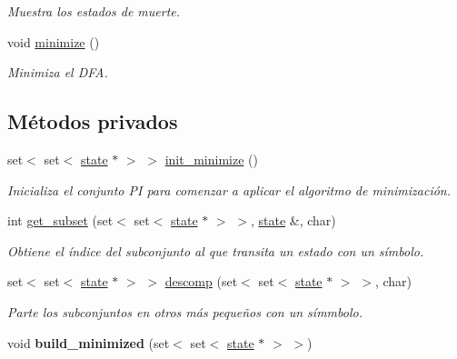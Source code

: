 \begin{DoxyCompactItemize}
\begin{DoxyCompactList}\small\item\em Muestra los estados de muerte. \end{DoxyCompactList}\item 
void \hyperlink{classdfa_a26fb1639aa9a6a5d9d8a079fd1989d0e}{minimize} ()
\begin{DoxyCompactList}\small\item\em Minimiza el D\+F\+A. \end{DoxyCompactList}\end{DoxyCompactItemize}
\subsection*{Métodos privados}
\begin{DoxyCompactItemize}
\item 
set$<$ set$<$ \hyperlink{classstate}{state} $\ast$ $>$ $>$ \hyperlink{classdfa_a23c531657e7259ffffd6a3fcf4b02691}{init\+\_\+minimize} ()
\begin{DoxyCompactList}\small\item\em Inicializa el conjunto P\+I para comenzar a aplicar el algoritmo de minimización. \end{DoxyCompactList}\item 
int \hyperlink{classdfa_af77ee3f7303bf187565a3740f8653797}{get\+\_\+subset} (set$<$ set$<$ \hyperlink{classstate}{state} $\ast$ $>$ $>$, \hyperlink{classstate}{state} \&, char)
\begin{DoxyCompactList}\small\item\em Obtiene el índice del subconjunto al que transita un estado con un símbolo. \end{DoxyCompactList}\item 
set$<$ set$<$ \hyperlink{classstate}{state} $\ast$ $>$ $>$ \hyperlink{classdfa_ab903e23857c42839f688e93c2d1cfc94}{descomp} (set$<$ set$<$ \hyperlink{classstate}{state} $\ast$ $>$ $>$, char)
\begin{DoxyCompactList}\small\item\em Parte los subconjuntos en otros más pequeños con un símmbolo. \end{DoxyCompactList}\item 
\hypertarget{classdfa_abcb8030d15366bc21c1a27432c05bab5}{}void {\bfseries build\+\_\+minimized} (set$<$ set$<$ \hyperlink{classstate}{state} $\ast$ $>$ $>$)\label{classdfa_abcb8030d15366bc21c1a27432c05bab5}


\end{DoxyCompactItemize}
